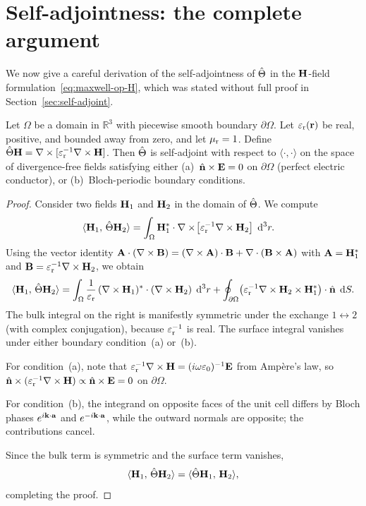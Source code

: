 \section{Self-adjointness: the complete argument}
\label{sec:self-adjoint-proof}

We now give a careful derivation of the self-adjointness of $\hat{\Theta}$ in the
$\mathbf{H}$-field formulation~\eqref{eq:maxwell-op-H}, which was stated without
full proof in Section~\ref{sec:self-adjoint}.

\begin{theorem}
\label{thm:self-adjoint}
Let $\Omega$ be a domain in $\mathbb{R}^3$ with piecewise smooth boundary
$\partial\Omega$. Let $\varepsilon_{\mathrm{r}}(\mathbf{r})$ be real, positive, and bounded away
from zero, and let $\mu_{\mathrm{r}} = 1$. Define
$\hat{\Theta}\mathbf{H} = \nabla\times[\varepsilon_{\mathrm{r}}^{-1}\nabla\times\mathbf{H}]$. Then $\hat{\Theta}$ is self-adjoint with
respect to $\langle\cdot,\cdot\rangle$ on the space of divergence-free
fields satisfying either
(a)~$\hat{\mathbf{n}}\times\mathbf{E} = 0$ on $\partial\Omega$ (perfect electric conductor),
or (b)~Bloch-periodic boundary conditions.
\end{theorem}

\begin{proof}
Consider two fields $\mathbf{H}_1$ and $\mathbf{H}_2$ in the domain of $\hat{\Theta}$. We
compute
\begin{align}
 \langle\mathbf{H}_1,\,\hat{\Theta}\mathbf{H}_2\rangle
 &= \int_\Omega \mathbf{H}_1^*\cdot
 \nabla\times\!\bigl[\varepsilon_{\mathrm{r}}^{-1}\nabla\times\mathbf{H}_2\bigr]\;\mathop{}\!\mathrm{d}^3 r.
 \label{eq:sa-step1}
\end{align}
Using the vector identity
$\mathbf{A}\cdot(\nabla\times\mathbf{B})
 = (\nabla\times\mathbf{A})\cdot\mathbf{B}
 + \nabla\cdot(\mathbf{B}\times\mathbf{A})$
with $\mathbf{A} = \mathbf{H}_1^*$ and
$\mathbf{B} = \varepsilon_{\mathrm{r}}^{-1}\nabla\times\mathbf{H}_2$, we obtain
\begin{equation}
 \langle\mathbf{H}_1,\,\hat{\Theta}\mathbf{H}_2\rangle
 = \int_\Omega \frac{1}{\varepsilon_{\mathrm{r}}}\,
 (\nabla\times\mathbf{H}_1)^*\cdot(\nabla\times\mathbf{H}_2)\;\mathop{}\!\mathrm{d}^3 r
 + \oint_{\partial\Omega}
 \bigl(\varepsilon_{\mathrm{r}}^{-1}\nabla\times\mathbf{H}_2\times\mathbf{H}_1^*\bigr)\cdot\hat{\mathbf{n}}\;\mathop{}\!\mathrm{d} S.
 \label{eq:sa-step2}
\end{equation}
The bulk integral on the right is manifestly symmetric under the exchange
$1\leftrightarrow 2$ (with complex conjugation), because $\varepsilon_{\mathrm{r}}^{-1}$ is
real. The surface integral vanishes under either boundary condition~(a)
or~(b).

For condition~(a), note that $\varepsilon_{\mathrm{r}}^{-1}\nabla\times\mathbf{H} = (i\omega\varepsilon_0)^{-1}\mathbf{E}$
from Amp\`ere's law, so
$\hat{\mathbf{n}}\times(\varepsilon_{\mathrm{r}}^{-1}\nabla\times\mathbf{H}) \propto \hat{\mathbf{n}}\times\mathbf{E} = 0$
on $\partial\Omega$.

For condition~(b), the integrand on opposite faces of the unit cell
differs by Bloch phases $e^{i\mathbf{k}\cdot\mathbf{a}}$ and $e^{-i\mathbf{k}\cdot\mathbf{a}}$,
while the outward normals are opposite; the contributions cancel.

Since the bulk term is symmetric and the surface term vanishes,
\begin{equation}
 \langle\mathbf{H}_1,\,\hat{\Theta}\mathbf{H}_2\rangle
 = \langle\hat{\Theta}\mathbf{H}_1,\,\mathbf{H}_2\rangle,
 \label{eq:sa-result}
\end{equation}
completing the proof.
\end{proof}


